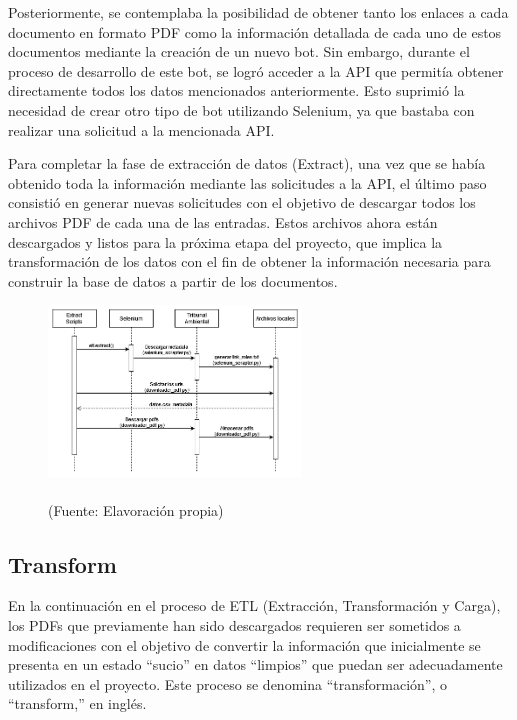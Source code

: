 Posteriormente, se contemplaba la posibilidad de obtener tanto los enlaces a cada documento en formato PDF como la información 
detallada de cada uno de estos documentos mediante la creación de un nuevo bot. Sin embargo, durante el proceso de desarrollo 
de este bot, se logró acceder a la API que permitía obtener directamente todos los datos mencionados anteriormente. Esto suprimió 
la necesidad de crear otro tipo de bot utilizando Selenium, ya que bastaba con realizar una solicitud a la mencionada API.

Para completar la fase de extracción de datos (Extract), una vez que se había obtenido toda la información mediante las solicitudes 
a la API, el último paso consistió en generar nuevas solicitudes con el objetivo de descargar todos los archivos PDF de cada una 
de las entradas. Estos archivos ahora están descargados y listos para la próxima etapa del proyecto, que implica la transformación 
de los datos con el fin de obtener la información necesaria para construir la base de datos a partir de los documentos.

\begin{figure}[ht!]
    \centering
    \includegraphics[width=0.6\textwidth]{figures/extract_diagram.png}
    \caption[]{\\
    {\scriptsize (Fuente: Elavoración propia)}}
    \label{fig:chatbot1}
\end{figure}



\subsection{Transform}

\par En la continuación en el proceso de ETL (Extracción, Transformación y Carga), los PDFs que previamente han sido descargados 
requieren ser sometidos a modificaciones con el objetivo de convertir la información que inicialmente se presenta en un 
estado ``sucio'' en datos ``limpios'' que puedan ser adecuadamente utilizados en el proyecto. Este proceso se denomina 
``transformación'', o ``transform,'' en inglés.

